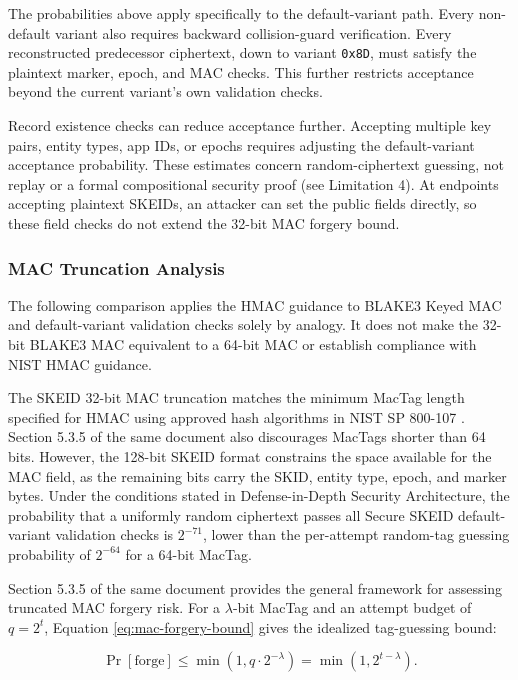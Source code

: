 \documentclass[a4paper,fleqn]{cas-sc}
\begin{document}
The probabilities above apply specifically to the default-variant path.
Every non-default variant also requires backward collision-guard
verification. Every reconstructed predecessor ciphertext, down to
variant \texttt{0x8D}, must satisfy the plaintext marker, epoch, and MAC
checks. This further restricts acceptance beyond the current variant's
own validation checks.

Record existence checks can reduce acceptance further. Accepting
multiple key pairs, entity types, app IDs, or epochs requires adjusting
the default-variant acceptance probability. These estimates concern
random-ciphertext guessing, not replay or a formal compositional
security proof (see Limitation 4). At endpoints accepting plaintext
SKEIDs, an attacker can set the public fields directly, so these field
checks do not extend the 32-bit MAC forgery bound.

\subsubsection{MAC Truncation Analysis}\label{mac-truncation-analysis}

The following comparison applies the HMAC guidance to BLAKE3 Keyed MAC
and default-variant validation checks solely by analogy. It does not
make the 32-bit BLAKE3 MAC equivalent to a 64-bit MAC or establish
compliance with NIST HMAC guidance.

The SKEID 32-bit MAC truncation matches the minimum MacTag length
specified for HMAC using approved hash algorithms in NIST SP 800-107
\citep[Section 5.3.3]{nistsp800107}. Section 5.3.5 of the same document
also discourages MacTags shorter than 64 bits. However, the 128-bit
SKEID format constrains the space available for the MAC field, as the
remaining bits carry the SKID, entity type, epoch, and marker bytes.
Under the conditions stated in Defense-in-Depth Security Architecture,
the probability that a uniformly random ciphertext passes all Secure
SKEID default-variant validation checks is \(2^{-71}\), lower than the
per-attempt random-tag guessing probability of \(2^{-64}\) for a 64-bit
MacTag.

Section 5.3.5 of the same document provides the general framework for
assessing truncated MAC forgery risk. For a \(\lambda\)-bit MacTag and
an attempt budget of \(q = 2^t\), Equation \eqref{eq:mac-forgery-bound}
gives the idealized tag-guessing bound:

\begin{equation}
\label{eq:mac-forgery-bound}
\Pr[\mathrm{forge}] \leq \min(1, q \cdot 2^{-\lambda})
  = \min(1, 2^{t-\lambda}).
\end{equation}
\end{document}
